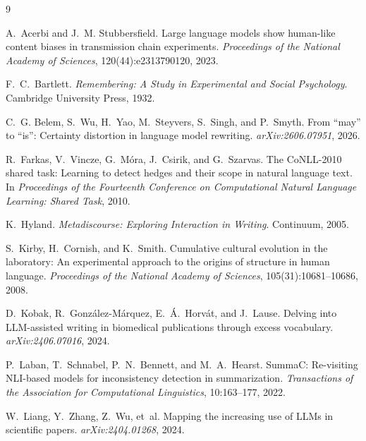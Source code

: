 \documentclass{article}
\begin{document}
\begin{thebibliography}{9}

A.~Acerbi and J.~M. Stubbersfield.
\newblock Large language models show human-like content biases in transmission chain experiments.
\newblock \emph{Proceedings of the National Academy of Sciences}, 120(44):e2313790120, 2023.

F.~C.~Bartlett.
\newblock \emph{Remembering: A Study in Experimental and Social Psychology}.
\newblock Cambridge University Press, 1932.

C.~G. Belem, S.~Wu, H.~Yao, M.~Steyvers, S.~Singh, and P.~Smyth.
\newblock From ``may'' to ``is'': Certainty distortion in language model rewriting.
\newblock \emph{arXiv:2606.07951}, 2026.

R.~Farkas, V.~Vincze, G.~M\'ora, J.~Csirik, and G.~Szarvas.
\newblock The CoNLL-2010 shared task: Learning to detect hedges and their scope in natural language text.
\newblock In \emph{Proceedings of the Fourteenth Conference on Computational Natural Language Learning: Shared Task}, 2010.

K.~Hyland.
\newblock \emph{Metadiscourse: Exploring Interaction in Writing}.
\newblock Continuum, 2005.

S.~Kirby, H.~Cornish, and K.~Smith.
\newblock Cumulative cultural evolution in the laboratory: An experimental approach to the origins of structure in human language.
\newblock \emph{Proceedings of the National Academy of Sciences}, 105(31):10681--10686, 2008.

D.~Kobak, R.~Gonz\'alez-M\'arquez, E.~\'A.~Horv\'at, and J.~Lause.
\newblock Delving into LLM-assisted writing in biomedical publications through excess vocabulary.
\newblock \emph{arXiv:2406.07016}, 2024.

P.~Laban, T.~Schnabel, P.~N.~Bennett, and M.~A.~Hearst.
\newblock SummaC: Re-visiting NLI-based models for inconsistency detection in summarization.
\newblock \emph{Transactions of the Association for Computational Linguistics}, 10:163--177, 2022.

W.~Liang, Y.~Zhang, Z.~Wu, et~al.
\newblock Mapping the increasing use of LLMs in scientific papers.
\newblock \emph{arXiv:2404.01268}, 2024.


\end{thebibliography}
\end{document}
